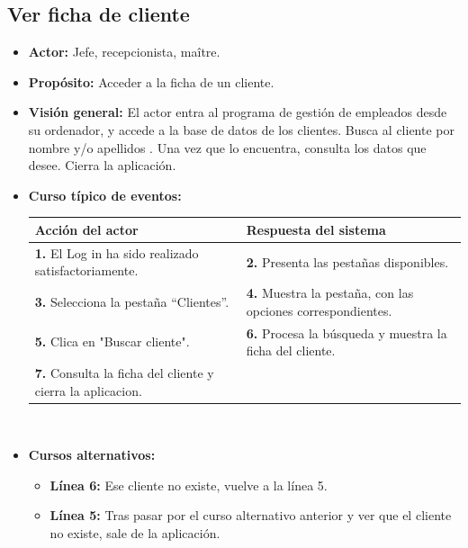 \documentclass[spanish,a4paper,12pt]{report}	%
\begin{document}
	\subsection{Ver ficha de cliente}
			\begin{itemize}
			\item \textbf{Actor:} Jefe, recepcionista, maître.
			\item \textbf{Propósito: } Acceder a la ficha de un cliente.
			\item \textbf{Visión general:} El actor entra al programa de gestión de empleados desde su ordenador, y accede a la base de datos de los clientes. Busca al cliente por nombre y/o apellidos . Una vez que lo encuentra, consulta los datos que desee. Cierra la aplicación. 
			\item \textbf{Curso típico de eventos:} 	\\
				\begin{tabular}{|p{6cm}||p{6cm}|}
				\hline
				\textbf{Acción del actor} & \textbf{Respuesta del sistema} \\ \hline \hline
				\textbf{1.} El Log in ha sido realizado satisfactoriamente. & \textbf{2.} Presenta las pestañas disponibles.\\ \hline
				\textbf{3.} Selecciona la pestaña “Clientes”. & \textbf{4.} Muestra la pestaña, con las opciones correspondientes. \\ \hline
				\textbf{5.} Clica en "Buscar cliente".	& \textbf{6.} Procesa la búsqueda y muestra la ficha del cliente. \\ \hline
				\textbf{7.} Consulta la ficha del cliente y cierra la aplicacion.& \\ \hline
				
			\end{tabular}
			\\
			\item \textbf{Cursos alternativos:} 
			\begin{itemize}
			\item  \textbf{Línea 6:} Ese cliente no existe, vuelve a la línea 5.
			\item  \textbf{Línea 5:} Tras pasar por el curso alternativo anterior y ver que el cliente no existe, sale de la aplicación.
			\end {itemize}
		\end{itemize}%



	\hspace{0.6 true cm}
\end{document}
